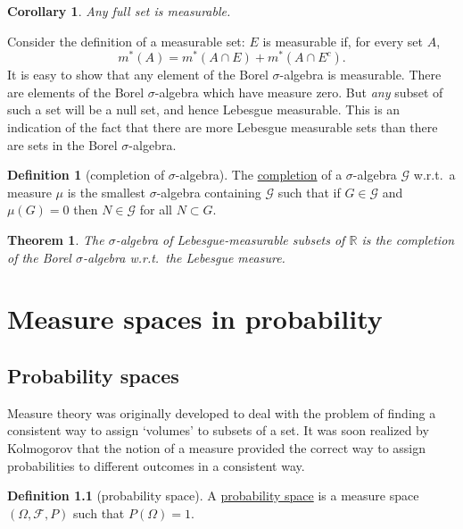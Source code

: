 \documentclass[a4paper,12pt]{scrreprt}
\newcommand{\R}{\mathbb{R}}
\newcommand{\defn}[1]{\ul{#1}}
\theoremstyle{definition}
\newtheorem{definition}{Definition}[section]
\theoremstyle{plain}
\newtheorem{theorem}{Theorem}[section]
\newtheorem{corollary}{Corollary}[section]
\theoremstyle{remark}
\begin{document}
\begin{corollary}
  \label{cor:fullsetsaremeasurable}
  Any full set is measurable.
\end{corollary}

Consider the definition of a measurable set: $E$ is measurable if, for every set $A$,
\begin{equation*}
  m^{*}(A) = m^{*}(A \cap E) + m^{*}(A \cap E^{c}).
\end{equation*}
It is easy to show that any element of the Borel $\sigma$-algebra is measurable. There are elements of the Borel $\sigma$-algebra which have measure zero. But \emph{any} subset of such a set will be a null set, and hence Lebesgue measurable. This is an indication of the fact that there are more Lebesgue measurable sets than there are sets in the Borel $\sigma$-algebra.

\begin{definition}[completion of $\sigma$-algebra]
  \label{def:completionofsigmaalgebra}
  The \defn{completion} of a $\sigma$-algebra $\mathcal{G}$ w.r.t.\ a measure $\mu$ is the smallest $\sigma$-algebra containing $\mathcal{G}$ such that if $G \in \mathcal{G}$ and $\mu(G) = 0$ then $N \in \mathcal{G}$ for all $N \subset G$.
\end{definition}

\begin{theorem}
  The $\sigma$-algebra of Lebesgue-measurable subsets of $\R$ is the completion of the Borel $\sigma$-algebra w.r.t.\ the Lebesgue measure.
\end{theorem}

\chapter{Measure spaces in probability}\label{ch:measure_spaces_in_probability}

\section{Probability spaces}\label{sec:probabilityspaces}
Measure theory was originally developed to deal with the problem of finding a consistent way to assign `volumes' to subsets of a set. It was soon realized by Kolmogorov that the notion of a measure provided the correct way to assign probabilities to different outcomes in a consistent way.

\begin{definition}[probability space]
  \label{def:probabilityspace}
  A \defn{probability space} is a measure space $(\Omega, \mathcal{F}, P)$ such that $P(\Omega) = 1$.
\end{definition}
\end{document}
